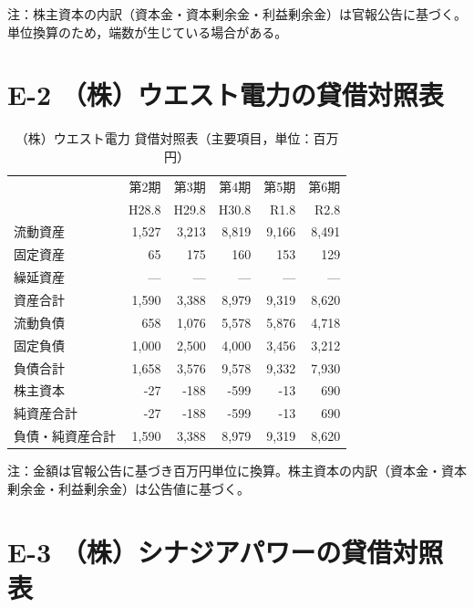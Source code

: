 \begin{flushleft}
\footnotesize
注：株主資本の内訳（資本金・資本剰余金・利益剰余金）は官報公告に基づく。
単位換算のため，端数が生じている場合がある。
\end{flushleft}

\section*{E-2 （株）ウエスト電力の貸借対照表}

\begin{table}[H]
\centering
\caption{（株）ウエスト電力 貸借対照表（主要項目，単位：百万円）}
\begin{tabular}{lrrrrr}
\toprule
 & 第2期 & 第3期 & 第4期 & 第5期 & 第6期 \\
 & H28.8 & H29.8 & H30.8 & R1.8 & R2.8 \\
\midrule
流動資産       & 1{,}527 & 3{,}213 & 8{,}819 & 9{,}166 & 8{,}491 \\
固定資産       & 65      & 175     & 160     & 153     & 129 \\
繰延資産       & —       & —       & —       & —       & — \\
\midrule
資産合計       & 1{,}590 & 3{,}388 & 8{,}979 & 9{,}319 & 8{,}620 \\
\midrule
流動負債       & 658     & 1{,}076 & 5{,}578 & 5{,}876 & 4{,}718 \\
固定負債       & 1{,}000 & 2{,}500 & 4{,}000 & 3{,}456 & 3{,}212 \\
負債合計       & 1{,}658 & 3{,}576 & 9{,}578 & 9{,}332 & 7{,}930 \\
\midrule
株主資本       & -27     & -188    & -599    & -13     & 690 \\
純資産合計     & -27     & -188    & -599    & -13     & 690 \\
\midrule
負債・純資産合計 & 1{,}590 & 3{,}388 & 8{,}979 & 9{,}319 & 8{,}620 \\
\bottomrule
\end{tabular}
\end{table}

\begin{flushleft}
\footnotesize
注：金額は官報公告に基づき百万円単位に換算。株主資本の内訳（資本金・資本剰余金・利益剰余金）は公告値に基づく。
\end{flushleft}

\section*{E-3 （株）シナジアパワーの貸借対照表}

